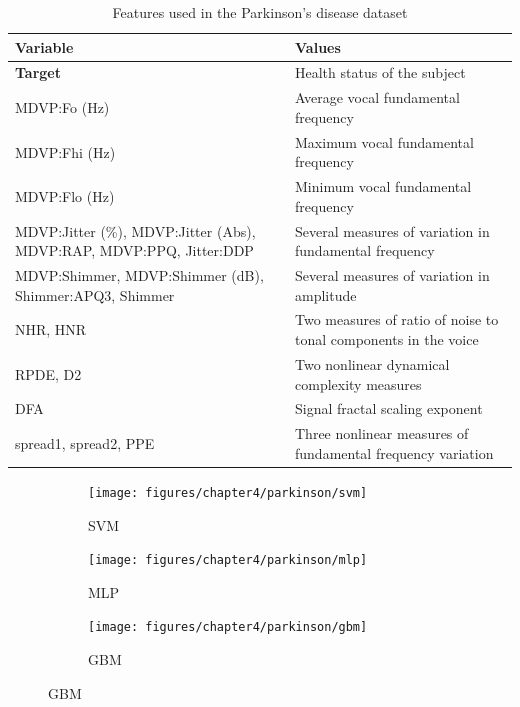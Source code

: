 \documentclass[10pt,a4paper,twoside]{book}
\begin{document}
\begin{table}[]
\centering
\caption{Features used in the Parkinson's disease dataset}
\label{parkinsons}
\begin{tabular}{p{7cm}p{7cm}}
\toprule
\textbf{Variable}                                                   & \textbf{Values}                                                    \\ \midrule
\textbf{Target}                                                     & Health status of the subject\\
MDVP:Fo (Hz)                                                        & Average vocal fundamental frequency                                \\
MDVP:Fhi (Hz)                                                       & Maximum vocal fundamental frequency                                \\
MDVP:Flo (Hz)                                                       & Minimum vocal fundamental frequency                                \\
MDVP:Jitter (\%), MDVP:Jitter (Abs), MDVP:RAP, MDVP:PPQ, Jitter:DDP & Several measures of variation in fundamental frequency             \\
MDVP:Shimmer, MDVP:Shimmer (dB), Shimmer:APQ3, Shimmer              & Several measures of variation in amplitude                         \\
NHR, HNR                                                            & Two measures of ratio of noise to tonal components in the voice    \\
RPDE, D2                                                            & Two nonlinear dynamical complexity measures                        \\
DFA                                                                 & Signal fractal scaling exponent                                    \\
spread1, spread2, PPE                                               & Three nonlinear measures of fundamental frequency variation        \\ \bottomrule
\end{tabular}
\end{table}


\begin{figure}[ht]
  \centering
  \caption{Benchmarking results for the Parkinson's disease dataset.}
  \begin{subfigure}[t]{0.5\textwidth}
  	\caption{SVM}
    \centering\texttt{[image: figures/chapter4/parkinson/svm]}
  \end{subfigure}
    \begin{subfigure}[t]{0.5\textwidth}
    \caption{MLP}
    \centering\texttt{[image: figures/chapter4/parkinson/mlp]}
  \end{subfigure}%
    \begin{subfigure}[t]{0.5\textwidth}
    \caption{GBM}
    \centering\texttt{[image: figures/chapter4/parkinson/gbm]}
  \end{subfigure}
  \label{fig:parkinson}
\end{figure}
\end{document}
